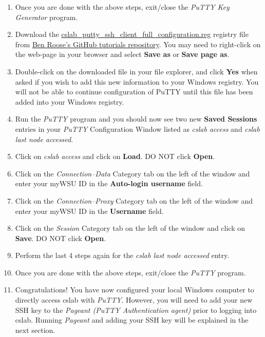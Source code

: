 \documentclass[12pt]{article}
\begin{document}
\begin{flushleft}
\begin{enumerate}
  \item Once you are done with the above steps, exit/close the \textit{PuTTY Key Generator} program.
  \item Download the \href{https://raw.githubusercontent.com/benroose/tutorials/master/cslab_tutorials/cslab_ssh_client_config_files/cslab_putty_ssh_client_full_configuration.reg}{cslab\_putty\_ssh\_client\_full\_configuration.reg} registry file from \href{https://github.com/benroose/tutorials/tree/master/cslab_tutorials/}{Ben Roose's GitHub tutorials repository}. You may need to right-click on the web-page in your browser and select \textbf{Save as} or \textbf{Save page as}.
  \item Double-click on the downloaded file in your file explorer, and click \textbf{Yes} when asked if you wish to add this new information to your Windows registry. You will not be able to continue configuration of PuTTY until this file has been added into your Windows registry.
  \item Run the \textit{PuTTY} program and you should now see two new \textbf{Saved Sessions} entries in your \textit{PuTTY} Configuration Window listed as \textit{cslab access} and \textit{cslab last node accessed}.
  \item Click on \textit{cslab access} and click on \textbf{Load}. DO NOT click \textbf{Open}.
  \item Click on the \textit{Connection--Data} Category tab on the left of the window and enter your myWSU ID in the \textbf{Auto-login username} field.
  \item Click on the \textit{Connection--Proxy} Category tab on the left of the window and enter your myWSU ID in the \textbf{Username} field.
  \item Click on the \textit{Session} Category tab on the left of the window and click on \textbf{Save}. DO NOT click \textbf{Open}.
  \item Perform the last 4 steps again for the \textit{cslab last node accessed} entry.
  \item Once you are done with the above steps, exit/close the \textit{PuTTY} program.
  \item Congratulations! You have now configured your local Windows computer to directly access cslab with \textit{PuTTY}. However, you will need to add your new SSH key to the \textit{Pageant (PuTTY Authentication agent)} prior to logging into cslab. Running \textit{Pageant} and adding your SSH key will be explained in the next section.
\end{enumerate}


\end{flushleft}
\end{document}
